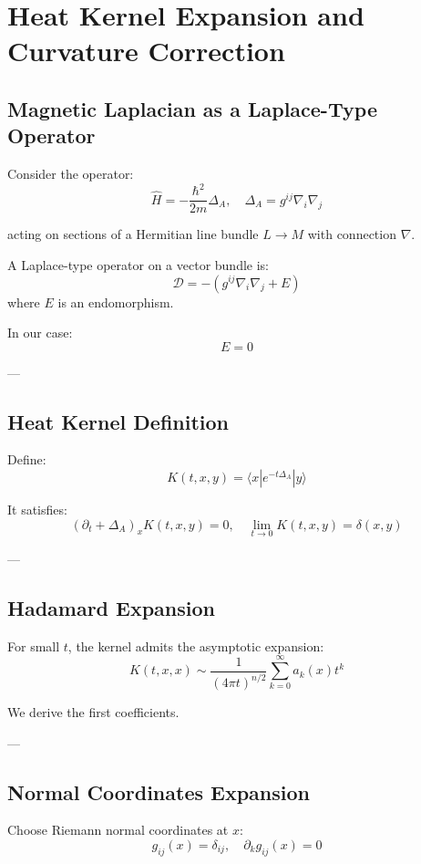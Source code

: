 
\section{Heat Kernel Expansion and Curvature Correction}

\subsection{Magnetic Laplacian as a Laplace-Type Operator}

Consider the operator:
\[
\hat{H} = -\frac{\hbar^2}{2m} \Delta_A,
\quad
\Delta_A = g^{ij}\nabla_i\nabla_j
\]

acting on sections of a Hermitian line bundle $L \to M$ with connection $\nabla$.

\begin{definition}
A Laplace-type operator on a vector bundle is:
\[
\mathcal{D} = - (g^{ij}\nabla_i\nabla_j + E)
\]
where $E$ is an endomorphism.
\end{definition}

In our case:
\[
E = 0
\]

---

\subsection{Heat Kernel Definition}

Define:
\[
K(t,x,y) = \langle x | e^{-t \Delta_A} | y \rangle
\]

It satisfies:
\[
(\partial_t + \Delta_A)_x K(t,x,y) = 0,
\quad
\lim_{t\to 0} K(t,x,y) = \delta(x,y)
\]

---

\subsection{Hadamard Expansion}

For small $t$, the kernel admits the asymptotic expansion:
\[
K(t,x,x) \sim \frac{1}{(4\pi t)^{n/2}}
\sum_{k=0}^\infty a_k(x) t^k
\]

We derive the first coefficients.

---

\subsection{Normal Coordinates Expansion}

Choose Riemann normal coordinates at $x$:
\[
g_{ij}(x) = \delta_{ij}, \quad \partial_k g_{ij}(x)=0
\]

